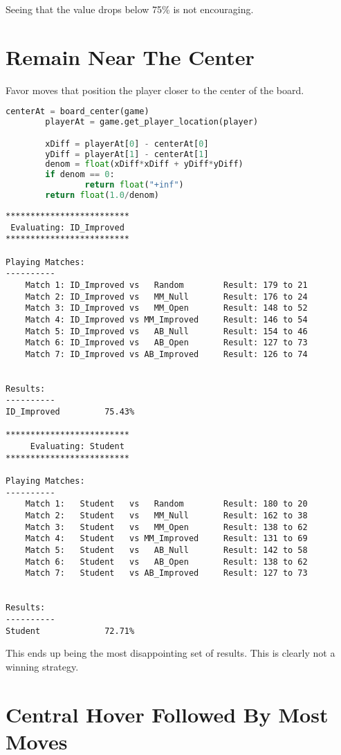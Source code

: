\documentclass[10pt, a4paper]{article}
\begin{document}
Seeing that the value drops below 75\% is not encouraging.

\section{Remain Near The Center}

Favor moves that position the player closer to the center of the board.

\begin{lstlisting}[language=Python]
		centerAt = board_center(game)
		playerAt = game.get_player_location(player)

		xDiff = playerAt[0] - centerAt[0]
		yDiff = playerAt[1] - centerAt[1]
		denom = float(xDiff*xDiff + yDiff*yDiff)
		if denom == 0:
				return float("+inf")
		return float(1.0/denom)
\end{lstlisting}

\begin{verbatim}
*************************
 Evaluating: ID_Improved 
*************************

Playing Matches:
----------
	Match 1: ID_Improved vs   Random    	Result: 179 to 21
	Match 2: ID_Improved vs   MM_Null   	Result: 176 to 24
	Match 3: ID_Improved vs   MM_Open   	Result: 148 to 52
	Match 4: ID_Improved vs MM_Improved 	Result: 146 to 54
	Match 5: ID_Improved vs   AB_Null   	Result: 154 to 46
	Match 6: ID_Improved vs   AB_Open   	Result: 127 to 73
	Match 7: ID_Improved vs AB_Improved 	Result: 126 to 74


Results:
----------
ID_Improved         75.43%

*************************
	 Evaluating: Student   
*************************

Playing Matches:
----------
	Match 1:   Student   vs   Random    	Result: 180 to 20
	Match 2:   Student   vs   MM_Null   	Result: 162 to 38
	Match 3:   Student   vs   MM_Open   	Result: 138 to 62
	Match 4:   Student   vs MM_Improved 	Result: 131 to 69
	Match 5:   Student   vs   AB_Null   	Result: 142 to 58
	Match 6:   Student   vs   AB_Open   	Result: 138 to 62
	Match 7:   Student   vs AB_Improved 	Result: 127 to 73


Results:
----------
Student             72.71%
\end{verbatim}

This ends up being the most disappointing set of results.  This is clearly not
a winning strategy.

\section{Central Hover Followed By Most Moves}
\end{document}

